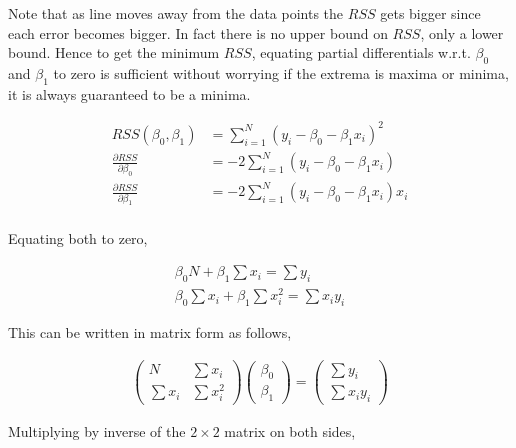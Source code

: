 \documentclass[11pt, a4paper]{article}
\begin{document}
Note that as line moves away from the data points the $RSS$ gets bigger since each error becomes bigger. In fact there is no upper bound on $RSS$, only a lower bound. Hence to get the minimum $RSS$, equating partial differentials w.r.t. $\beta_0$ and $\beta_1$ to zero is sufficient without worrying if the extrema is maxima or minima, it is always guaranteed to be a minima.

\begin{align*}
	RSS(\beta_0, \beta_1)                 & = \sum\limits_{i = 1}^N (y_i - \beta_0 - \beta_1x_i)^2    \\
	\frac{\partial RSS}{\partial \beta_0} & = -2\sum\limits_{i = 1}^N (y_i - \beta_0 - \beta_1x_i)    \\
	\frac{\partial RSS}{\partial \beta_1} & = -2\sum\limits_{i = 1}^N (y_i - \beta_0 - \beta_1x_i)x_i \\
\end{align*}

Equating both to zero,

\begin{align*}
	\beta_0N + \beta_1\sum x_i = \sum y_i             \\
	\beta_0\sum x_i + \beta_1\sum x_i^2 = \sum x_iy_i 
\end{align*}

This can be written in matrix form as follows,

\begin{align*}
	\begin{pmatrix} N & \sum x_i \\ \sum x_i & \sum x_i^2 \end{pmatrix} \begin{pmatrix} \beta_0 \\ \beta_1 \end{pmatrix} = \begin{pmatrix}
	\sum y_i \\ \sum x_iy_i \end{pmatrix}
\end{align*}


Multiplying by inverse of the $2\times2$ matrix on both sides,
\end{document}
